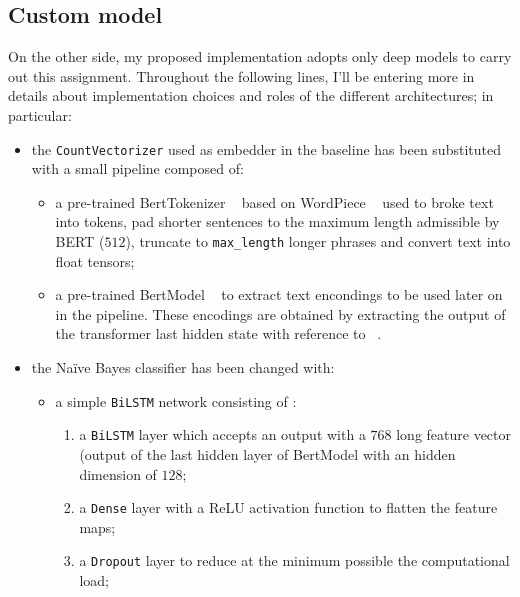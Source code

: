 \subsection{Custom model}
\label{subsec:cutsom}
On the other side, my proposed implementation adopts only deep models to carry out this assignment. Throughout the following lines, I'll be entering 
more in details about implementation choices and roles of the different architectures; in particular:
\begin{itemize}

    \item the \texttt{CountVectorizer} used as embedder in the baseline has been substituted with a small pipeline composed of:
        \begin{itemize}

            \item a pre-trained BertTokenizer ~\cite{tokenizer} based on WordPiece ~\cite{wordpiece} used to broke text into tokens, 
                pad shorter sentences to the maximum length admissible by BERT ($512$), truncate to \texttt{max\_length} longer phrases 
                and convert text into float tensors;

            \item a pre-trained BertModel ~\cite{model} to extract text encondings to be used later on in the pipeline. These encodings
                are obtained by extracting the output of the transformer last hidden state with reference to ~\cite{mtl}.

        \end{itemize}

    \item the Na\"{i}ve Bayes classifier has been changed with: 
        \begin{itemize}

            \item a simple \texttt{BiLSTM} network consisting of : 
                \begin{enumerate}

                    \item a \texttt{BiLSTM} layer which accepts an output with a $768$ long feature vector (output of the last hidden 
                        layer of BertModel with an hidden dimension of $128$;

                    \item a \texttt{Dense} layer with a ReLU activation function to flatten the feature maps;

                    \item a \texttt{Dropout} layer to reduce at the minimum possible the computational load;


\end{enumerate}
\end{itemize}
\end{itemize}
